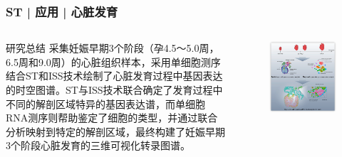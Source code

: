 \documentclass[11pt]{ctexbeamer}
\begin{document}
\begin{frame}
	\frametitle{ST | 应用 | 心脏发育}
	\begin{columns}
		\begin{block}{研究总结}
			采集妊娠早期3个阶段（孕4.5～5.0周，6.5周和9.0周）的心脏组织样本，采用单细胞测序结合ST和ISS技术绘制了心脏发育过程中基因表达的时空图谱。ST与ISS技术联合确定了发育过程中不同的解剖区域特异的基因表达谱，而单细胞RNA测序则帮助鉴定了细胞的类型，并通过联合分析映射到特定的解剖区域，最终构建了妊娠早期3个阶段心脏发育的三维可视化转录图谱。
			\end{block}
	\begin{figure}
		\includegraphics[width=\textwidth]{ST_heart_03.png}
	\end{figure}
	\end{columns}
\end{frame}
\end{document}
